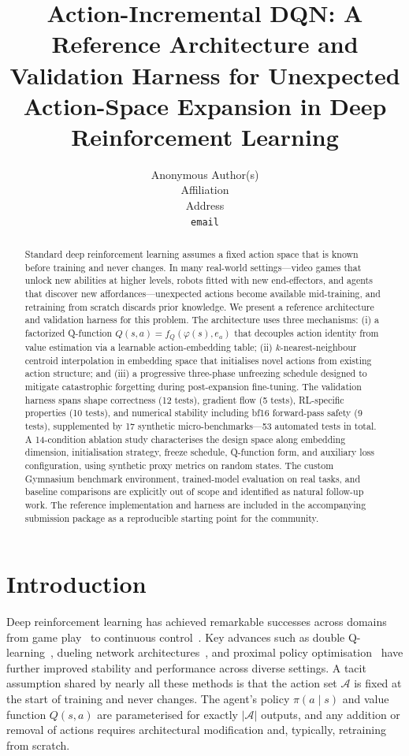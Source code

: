 \documentclass{article}
\title{Action-Incremental DQN: A Reference Architecture and Validation Harness
  for Unexpected Action-Space Expansion in Deep Reinforcement Learning}
\author{%
  Anonymous Author(s) \\
  Affiliation \\
  Address \\
  \texttt{email} \\
}
\begin{document}
\maketitle

\begin{abstract}
Standard deep reinforcement learning assumes a fixed action space that is known
before training and never changes. In many real-world settings---video games that
unlock new abilities at higher levels, robots fitted with new end-effectors, and
agents that discover new affordances---unexpected actions become available
mid-training, and retraining from scratch discards prior knowledge. We present a
reference architecture and validation harness for this problem. The architecture
uses three mechanisms: (i) a factorized Q-function
$Q(s,a)=f_Q(\varphi(s),e_a)$ that decouples action identity from value
estimation via a learnable action-embedding table; (ii) $k$-nearest-neighbour
centroid interpolation in embedding space that initialises novel actions from
existing action structure; and (iii) a progressive three-phase unfreezing
schedule designed to mitigate catastrophic forgetting during post-expansion
fine-tuning. The validation harness spans shape correctness (12 tests), gradient
flow (5 tests), RL-specific properties (10 tests), and numerical stability
including bf16 forward-pass safety (9 tests), supplemented by 17 synthetic
micro-benchmarks---53 automated tests in total. A 14-condition ablation study
characterises the design space along embedding dimension, initialisation
strategy, freeze schedule, Q-function form, and auxiliary loss configuration,
using synthetic proxy metrics on random states. The custom Gymnasium benchmark
environment, trained-model evaluation on real tasks, and baseline comparisons
are explicitly out of scope and identified as natural follow-up work. The
reference implementation and harness are included in the accompanying
submission package as a reproducible starting point for the community.
\end{abstract}


\section{Introduction}

Deep reinforcement learning has achieved remarkable successes across domains
from game play~\cite{mnih2015human, mnih2013playing} to continuous
control~\cite{lillicrap2015continuous}. Key advances such as double
Q-learning~\cite{vanhasselt2016deep}, dueling network
architectures~\cite{wang2016dueling}, and proximal policy
optimisation~\cite{schulman2017proximal} have further improved stability and
performance across diverse settings. A tacit assumption shared by nearly all
these methods is that the action set $\mathcal{A}$ is fixed at the start of
training and never changes. The agent's policy $\pi(a \mid s)$ and value
function $Q(s,a)$ are parameterised for exactly $|\mathcal{A}|$ outputs, and
any addition or removal of actions requires architectural modification and,
typically, retraining from scratch.
\end{document}
